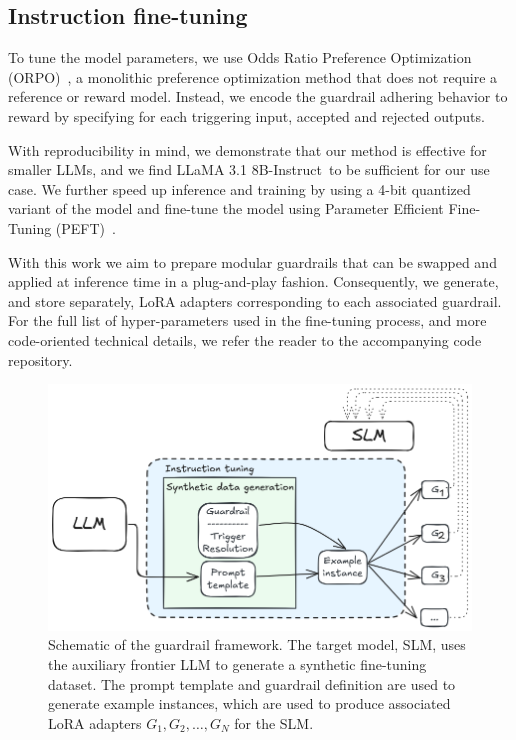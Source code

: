 \documentclass[letterpaper]{article}
\newcommand{\slmm}{LLaMA 3.1 8B-Instruct}
\begin{document}
\subsection{Instruction fine-tuning}
To tune the model parameters, we use Odds Ratio Preference Optimization (ORPO)~\cite{hong2024orpo}, a monolithic preference optimization method that does not require a reference or reward model. Instead, we encode the guardrail adhering behavior to reward by specifying for each triggering input, accepted and rejected outputs.

With reproducibility in mind, we demonstrate that our method is effective for smaller LLMs, and we find \slmm~to be sufficient for our use case. We further speed up inference and training by using a 4-bit quantized variant of the model and fine-tune the model using Parameter Efficient Fine-Tuning (PEFT)~\cite{unsloth, hu2021lora}. 

With this work we aim to prepare modular guardrails that can be swapped and applied at inference time in a plug-and-play fashion. 
Consequently, we generate, and store separately, LoRA adapters corresponding to each associated guardrail. For the full list of hyper-parameters used in the fine-tuning process, and more code-oriented technical details, we refer the reader to the accompanying code repository.
\begin{figure}[!ht]
	\centering
	\includegraphics[width=1.0\linewidth]{figures/datagenSchematic.png}
	\caption{Schematic of the guardrail framework. The target model, SLM, uses the auxiliary frontier LLM to generate a synthetic fine-tuning dataset. 
		The prompt template and guardrail definition are used to generate example instances, which are used to produce associated LoRA adapters $G_1, G_2, \ldots, G_N$ for the SLM.}\label{fig:method-schematic-label}
\end{figure} 
\end{document}
